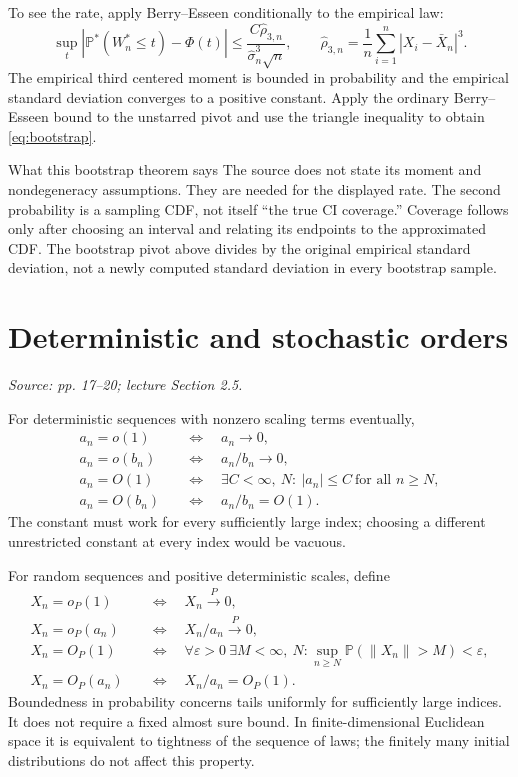 \documentclass[12pt]{article}
\newcommand{\Prob}{\mathbb P}
\begin{document}
To see the rate, apply Berry--Esseen conditionally to the empirical law:
\begin{equation}
 \sup_t|\Prob^*(W_n^*\le t)-\Phi(t)|
 \le\frac{C\widehat\rho_{3,n}}{\widehat\sigma_n^3\sqrt n},
 \qquad\widehat\rho_{3,n}=\frac1n\sum_{i=1}^n|X_i-\bar X_n|^3.
\end{equation}
The empirical third centered moment is bounded in probability and the
empirical standard deviation converges to a positive constant. Apply the
ordinary Berry--Esseen bound to the unstarred pivot and use the triangle
inequality to obtain \eqref{eq:bootstrap}.
\begin{correctionbox}{What this bootstrap theorem says}
The source does not state its moment and nondegeneracy assumptions. They
are needed for the displayed rate. The second probability is a sampling
CDF, not itself ``the true CI coverage.'' Coverage follows only after
choosing an interval and relating its endpoints to the approximated CDF.
The bootstrap pivot above divides by the original empirical standard
deviation, not a newly computed standard deviation in every bootstrap sample.
\end{correctionbox}

\section{Deterministic and stochastic orders}
\textit{Source: pp. 17--20; lecture Section 2.5.}

For deterministic sequences with nonzero scaling terms eventually,
\begin{align}
 a_n=o(1)&\quad\Longleftrightarrow\quad a_n\to0,\\
 a_n=o(b_n)&\quad\Longleftrightarrow\quad a_n/b_n\to0,\\
 a_n=O(1)&\quad\Longleftrightarrow\quad
 \exists C<\infty,\ N:\ |a_n|\le C\ \text{for all }n\ge N,\\
 a_n=O(b_n)&\quad\Longleftrightarrow\quad a_n/b_n=O(1).
\end{align}
The constant must work for every sufficiently large index; choosing a
different unrestricted constant at every index would be vacuous.

For random sequences and positive deterministic scales, define
\begin{align}
 X_n=o_P(1)&\quad\Longleftrightarrow\quad X_n\xrightarrow{P}0,\\
 X_n=o_P(a_n)&\quad\Longleftrightarrow\quad X_n/a_n\xrightarrow{P}0,\\
 X_n=O_P(1)&\quad\Longleftrightarrow\quad
 \forall\varepsilon>0\ \exists M<\infty,\ N:
 \sup_{n\ge N}\Prob(\|X_n\|>M)<\varepsilon,\\
 X_n=O_P(a_n)&\quad\Longleftrightarrow\quad X_n/a_n=O_P(1).
\end{align}
Boundedness in probability concerns tails uniformly for sufficiently large
indices. It does not require a fixed almost sure bound. In finite-dimensional
Euclidean space it is equivalent to tightness of the sequence of laws;
the finitely many initial distributions do not affect this property.
\end{document}
